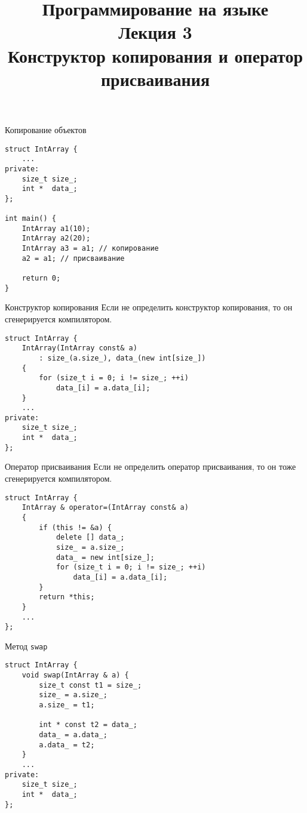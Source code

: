\documentclass{beamer}
\title{{\bf Программирование на языке \langcpp\protect\\Лекция
3\protect\vspace{1em}\\}Конструктор копирования и оператор присваивания}
\begin{document}
\begin{frame} 
  \titlepage
\end{frame}

\begin{frame}[fragile]{Копирование объектов}{}
\begin{lstlisting}
struct IntArray {
    ...
private:
    size_t size_;
    int *  data_;
};

int main() {
    IntArray a1(10);
    IntArray a2(20);
    IntArray a3 = a1; // копирование
    a2 = a1; // присваивание

    return 0;
}
\end{lstlisting}
\end{frame}

\begin{frame}[fragile]{Конструктор копирования}{}
Если не определить конструктор копирования,
то он сгенерируется компилятором.
\begin{lstlisting}
struct IntArray {
    IntArray(IntArray const& a) 
        : size_(a.size_), data_(new int[size_]) 
    {
        for (size_t i = 0; i != size_; ++i)
            data_[i] = a.data_[i];    
    }
    ...
private:
    size_t size_;
    int *  data_;
};
\end{lstlisting}
\end{frame}

\begin{frame}[fragile]{Оператор присваивания}{}
Если не определить оператор присваивания,
то он тоже сгенерируется компилятором.
\begin{lstlisting}
struct IntArray {
    IntArray & operator=(IntArray const& a) 
    {
        if (this != &a) {
            delete [] data_;
            size_ = a.size_;
            data_ = new int[size_];
            for (size_t i = 0; i != size_; ++i)
                data_[i] = a.data_[i];
        }
        return *this;
    }
    ...
};
\end{lstlisting}
\end{frame}

\begin{frame}[fragile]{Метод {\tt swap}}{}
\begin{lstlisting}
struct IntArray {
    void swap(IntArray & a) {
        size_t const t1 = size_;
        size_ = a.size_;
        a.size_ = t1;

        int * const t2 = data_;
        data_ = a.data_;
        a.data_ = t2;
    }
    ...
private:
    size_t size_;
    int *  data_;
};
\end{lstlisting}
\end{frame}
\end{document}
